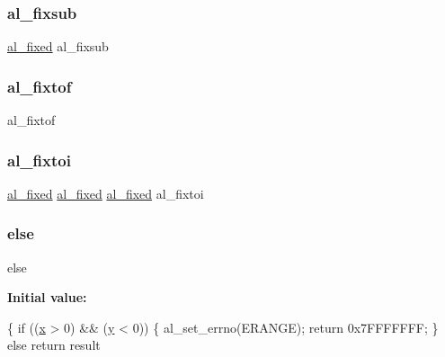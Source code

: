 \mbox{\label{fmaths_8inl_a55d08ff07fc58a72689782633b1be661}} 
\subsubsection{\texorpdfstring{al\+\_\+fixsub}{al\_fixsub}}
{\footnotesize\ttfamily \hyperlink{fixed_8h_acaad2e927f969d9882d1e1e80ac1c5e2}{al\+\_\+fixed} al\+\_\+fixsub}

\mbox{\label{fmaths_8inl_aa1e2c601fa27155cba5c96c6f7a541d6}} 
\subsubsection{\texorpdfstring{al\+\_\+fixtof}{al\_fixtof}}
{\footnotesize\ttfamily al\+\_\+fixtof}

\mbox{\label{fmaths_8inl_a94eec075305949523ebacef79cfcdd43}} 
\subsubsection{\texorpdfstring{al\+\_\+fixtoi}{al\_fixtoi}}
{\footnotesize\ttfamily \hyperlink{fixed_8h_acaad2e927f969d9882d1e1e80ac1c5e2}{al\+\_\+fixed} \hyperlink{fixed_8h_acaad2e927f969d9882d1e1e80ac1c5e2}{al\+\_\+fixed} \hyperlink{fixed_8h_acaad2e927f969d9882d1e1e80ac1c5e2}{al\+\_\+fixed} al\+\_\+fixtoi}

\mbox{\label{fmaths_8inl_a0544c3fe466e421738dae463968b70ba}} 
\subsubsection{\texorpdfstring{else}{else}}
{\footnotesize\ttfamily else}

{\bfseries Initial value\+:}
\begin{DoxyCode}
\{
      \textcolor{keywordflow}{if} ((\hyperlink{fmaths_8inl_a7ba8ab2f1e8f362163e17da3f15a5db9}{x} > 0) && (\hyperlink{fmaths_8inl_ad01ab75ae50a1a624185bfa014c66cfa}{y} < 0)) \{
         al\_set\_errno(ERANGE);
         \textcolor{keywordflow}{return} 0x7FFFFFFF;
      \}
      \textcolor{keywordflow}{else}
         \textcolor{keywordflow}{return} result
\end{DoxyCode}
\mbox{\label{fmaths_8inl_a7ba8ab2f1e8f362163e17da3f15a5db9}} 

